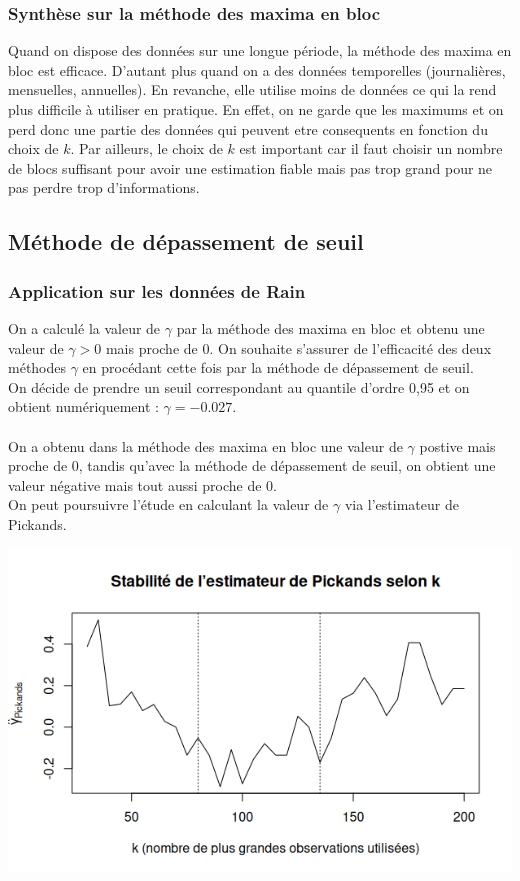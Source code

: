 \documentclass{article}
\theoremstyle{plain}
\theoremstyle{definition}
\theoremstyle{plain}
\begin{document}
\subsubsection{Synthèse sur la méthode des maxima en bloc}

Quand on dispose des données sur une longue période, la méthode des maxima en bloc est efficace. D'autant plus quand on a des données temporelles (journalières, mensuelles, annuelles).
En revanche, elle utilise moins de données ce qui la rend plus difficile à utiliser en pratique. En effet, on ne garde que les maximums et on perd donc une partie des données qui peuvent etre consequents en fonction du choix de $k$.
Par ailleurs, le choix de $k$ est important car il faut choisir un nombre de blocs suffisant pour avoir une estimation fiable mais pas trop grand pour ne pas perdre trop d'informations.

\subsection{Méthode de dépassement de seuil}


\subsubsection{Application sur les données de Rain}

On a calculé la valeur de $\gamma$ par la méthode des maxima en bloc et obtenu une valeur de $\gamma > 0 $ mais proche de 0. On souhaite s'assurer de l'efficacité des deux méthodes $\gamma$
en procédant cette fois par la méthode de dépassement de seuil.
\\
On décide de prendre un seuil correspondant au quantile d’ordre 0,95 et on obtient numériquement : $\gamma  = -0.027$.
\\
\\
On a obtenu dans la méthode des maxima en bloc une valeur de $\gamma$ postive mais proche de 0,
tandis qu'avec la méthode de dépassement de seuil, on obtient une valeur négative mais tout aussi proche de 0.
\\
On peut poursuivre l'étude en calculant la valeur de $\gamma$ via l'estimateur de Pickands.

\begin{center}
	\includegraphics[scale=0.57]{./images/pickandsrain.png} 
\end{center}
\end{document}
